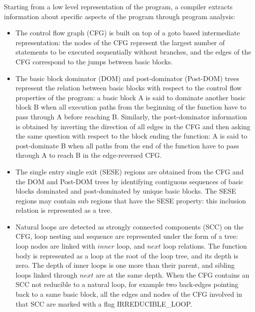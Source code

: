 \documentclass{sigplanconf}
\begin{document}
Starting from a low level representation of the program, a compiler extracts
information about specific aspects of the program through program analysis:

\begin{itemize}
\item The control flow graph (CFG) \cite{dragonbook} is built on top of a goto
  based intermediate representation: the nodes of the CFG represent the largest
  number of statements to be executed sequentially without branches, and the
  edges of the CFG correspond to the jumps between basic blocks.

\item The basic block dominator (DOM) and post-dominator (Post-DOM) trees
  \cite{dragonbook} represent the relation between basic blocks with respect to
  the control flow properties of the program: a basic block A is said to
  dominate another basic block B when all execution paths from the beginning of
  the function have to pass through A before reaching B.  Similarly, the
  post-dominator information is obtained by inverting the direction of all edges
  in the CFG and then asking the same question with respect to the block ending
  the function: A is said to post-dominate B when all paths from the end of the
  function have to pass through A to reach B in the edge-reversed CFG.

\item The single entry single exit (SESE) regions \cite{sese} are
  obtained from the CFG and the DOM and Post-DOM trees by identifying contiguous
  sequences of basic blocks dominated and post-dominated by unique basic blocks.
  The SESE regions may contain sub regions that have the SESE property: this
  inclusion relation is represented as a tree.

\label{subsec:loop-tree}
\item Natural loops \cite{dragonbook} are detected as strongly connected
  components (SCC) \cite{tarjan} on the CFG, loop nesting and sequence are
  represented under the form of a tree: loop nodes are linked with $inner$ loop,
  and $next$ loop relations.  The function body is represented as a loop at the
  root of the loop tree, and its depth is zero.  The depth of inner loops is one
  more than their parent, and sibling loops linked through $next$ are at the
  same depth.  When the CFG contains an SCC not reducible to a natural loop, for
  example two back-edges pointing back to a same basic block, all the edges and
  nodes of the CFG involved in that SCC are marked with a flag IRREDUCIBLE\_LOOP.


\end{itemize}
\end{document}
